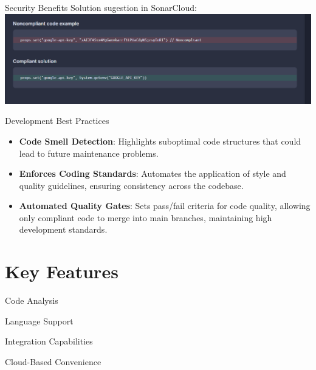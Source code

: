 \documentclass{beamer}
\begin{document}
\begin{frame}{Security Benefits}
  Solution sugestion in SonarCloud:
  \includegraphics[width=1.04\textwidth]{fig/api-security-2.PNG}
\end{frame}

\begin{frame}{Development Best Practices}
  \begin{itemize}
    \item \textbf{Code Smell Detection}: Highlights suboptimal code structures that could lead to future maintenance problems.
    \item \textbf{Enforces Coding Standards}: Automates the application of style and quality guidelines, ensuring consistency across the codebase.
    \item \textbf{Automated Quality Gates}: Sets pass/fail criteria for code quality, allowing only compliant code to merge into main branches, maintaining high development standards.
  \end{itemize}
\end{frame}


\section[Key Features]{Key Features}

\begin{frame}{Code Analysis}
\end{frame}

\begin{frame}{Language Support}
  
\end{frame}

\begin{frame}{Integration Capabilities}
  
\end{frame}

\begin{frame}{Cloud-Based Convenience}

\end{frame}
\end{document}
